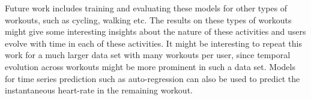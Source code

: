 \documentclass{acm_proc_article-sp}
\begin{document}
Future work includes training and evaluating these models for other types of workouts, such as cycling, walking etc. The results on these types of workouts might give some interesting insights about the nature of these activities and users evolve with time in each of these activities. It might be interesting to repeat this work for a much larger data set with many workouts per user, since temporal evolution across workouts might be more prominent in such a data set. Models for time series prediction such as auto-regression \cite{autoRegressiveModelWiki} can also be used to predict the instantaneous heart-rate in the remaining workout.




\end{document}
